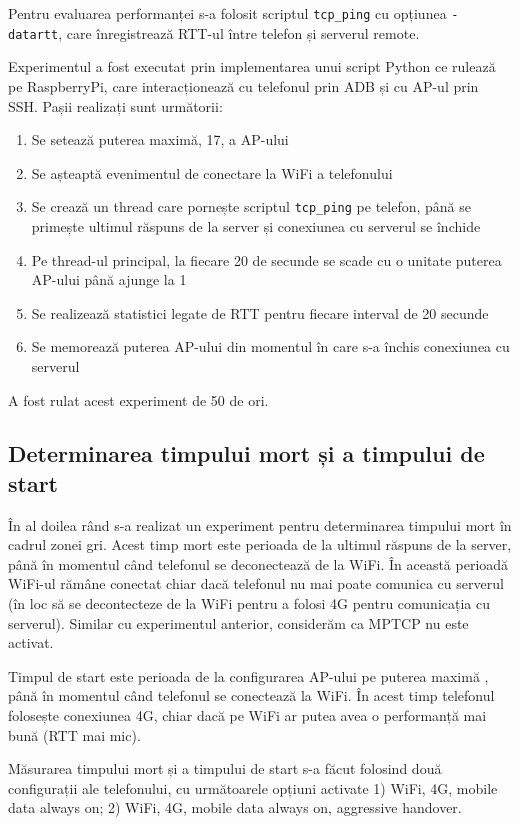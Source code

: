 Pentru evaluarea performanței s-a folosit scriptul \texttt{tcp\_ping} cu opțiunea \texttt{-datartt}, care înregistrează RTT-ul între telefon și serverul remote. 

Experimentul a fost executat prin implementarea unui script Python ce rulează pe RaspberryPi, care interacționează cu telefonul prin ADB și cu AP-ul prin SSH. Pașii realizați sunt următorii:
\begin{enumerate}
	\item Se setează puterea maximă, 17,  a AP-ului
	\item Se așteaptă evenimentul de conectare la WiFi a telefonului
	\item Se crează un thread care pornește scriptul \texttt{tcp\_ping} pe telefon, până se primește ultimul răspuns de la server și conexiunea cu serverul se închide
	\item Pe thread-ul principal, la fiecare 20 de secunde se scade cu o unitate puterea AP-ului până ajunge la 1
	\item Se realizează statistici legate de RTT pentru fiecare interval de 20 secunde
	\item Se memorează puterea AP-ului din momentul în care s-a închis conexiunea cu serverul 
\end{enumerate}

A fost rulat acest experiment de 50 de ori.

\subsection{Determinarea timpului mort și a timpului de start}

În al doilea rând s-a realizat un experiment pentru determinarea timpului mort în cadrul zonei gri. Acest timp mort este perioada de la ultimul răspuns de la server, până în momentul când telefonul se deconectează de la WiFi. În această perioadă WiFi-ul rămâne conectat chiar dacă telefonul nu mai poate comunica cu serverul (în loc să se decontecteze de la WiFi pentru a folosi 4G pentru comunicația cu serverul). Similar cu experimentul anterior, considerăm ca MPTCP nu este activat.

Timpul de start este perioada de la configurarea AP-ului pe puterea maximă , până în momentul când telefonul se conectează la WiFi. În acest timp telefonul folosește conexiunea 4G, chiar dacă pe WiFi ar putea avea o performanță mai bună (RTT mai mic).

Măsurarea timpului mort și a timpului de start s-a făcut folosind două configurații ale telefonului, cu următoarele opțiuni activate 1) WiFi, 4G, mobile data always on; 2) WiFi, 4G, mobile data always on, aggressive handover. 

